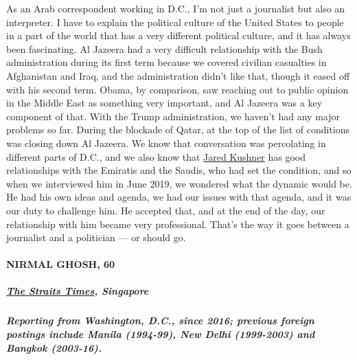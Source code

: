 As an Arab correspondent working in D.C., I'm not just a journalist but
also an interpreter. I have to explain the political culture of the
United States to people in a part of the world that has a very different
political culture, and it has always been fascinating. Al Jazeera had a
very difficult relationship with the Bush administration during its
first term because we covered civilian casualties in Afghanistan and
Iraq, and the administration didn't like that, though it eased off with
his second term. Obama, by comparison, saw reaching out to public
opinion in the Middle East as something very important, and Al Jazeera
was a key component of that. With the Trump administration, we haven't
had any major problems so far. During the blockade of Qatar, at the top
of the list of conditions was closing down Al Jazeera. We know that
conversation was percolating in different parts of D.C., and we also
know that
\href{https://www.nytimes.com/2020/03/05/us/politics/jared-kushner-cadre.html}{Jared
Kushner} has good relationships with the Emiratis and the Saudis, who
had set the condition, and so when we interviewed him in June 2019, we
wondered what the dynamic would be. He had his own ideas and agenda, we
had our issues with that agenda, and it was our duty to challenge him.
He accepted that, and at the end of the day, our relationship with him
became very professional. That's the way it goes between a journalist
and a politician --- or should go.

\hypertarget{nirmal-ghosh-60}{%
\paragraph{NIRMAL GHOSH, 60}\label{nirmal-ghosh-60}}

\hypertarget{the-straits-times-singapore}{%
\subparagraph{\texorpdfstring{\textbf{\href{https://www.straitstimes.com/authors/nirmal-ghosh}{The
Straits Times},
Singapore}}{The Straits Times, Singapore}}\label{the-straits-times-singapore}}

\hypertarget{reporting-from-washington-dc-since-2016-previous-foreign-postings-include-manila-1994-99-new-delhi-1999-2003-and-bangkok-2003-16}{%
\subparagraph{\texorpdfstring{\textbf{Reporting from Washington, D.C.,
since 2016; previous foreign postings include Manila (1994-99), New
Delhi (1999-2003) and Bangkok
(2003-16).}}{Reporting from Washington, D.C., since 2016; previous foreign postings include Manila (1994-99), New Delhi (1999-2003) and Bangkok (2003-16).}}\label{reporting-from-washington-dc-since-2016-previous-foreign-postings-include-manila-1994-99-new-delhi-1999-2003-and-bangkok-2003-16}}

